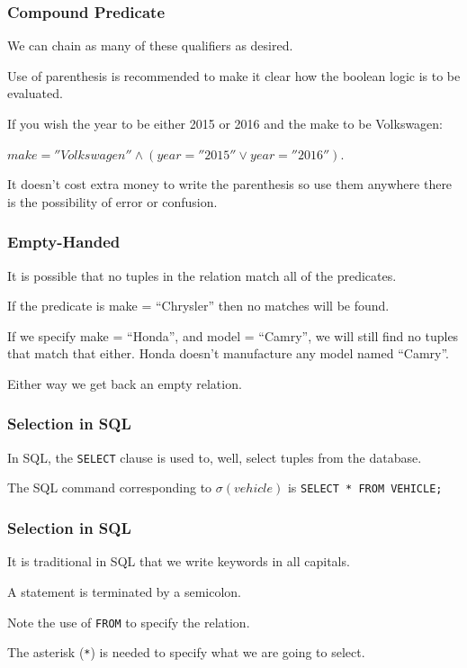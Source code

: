 \begin{frame}
\frametitle{Compound Predicate}

We can chain as many of these qualifiers as desired. 

Use of parenthesis is recommended to make it clear how the boolean logic is to be evaluated. 

If you wish the year to be either 2015 or 2016 and the make to be Volkswagen:

$make = ''Volkswagen'' \wedge ( year = ''2015'' \vee year = ''2016'' )$.

It doesn't cost extra money to write the parenthesis so use them anywhere there is the possibility of error or confusion. 


\end{frame}



\begin{frame}
\frametitle{Empty-Handed}

It is possible that no tuples in the relation match all of the predicates. 

If the predicate is make = ``Chrysler'' then no matches will be found. 

If we specify make = ``Honda'', and model = ``Camry'', we will still find no tuples that match that either. Honda doesn't manufacture any model named ``Camry''.

Either way we get back an empty relation.


\end{frame}




\begin{frame}
\frametitle{Selection in SQL}

In SQL, the \texttt{SELECT} clause is used to, well, select tuples from the database. 

The SQL command corresponding to $\sigma( vehicle )$ is \texttt{SELECT * FROM VEHICLE;} 

\end{frame}




\begin{frame}
\frametitle{Selection in SQL}

It is traditional in SQL that we write keywords in all capitals.

A statement is terminated by a semicolon. 

Note the use of \texttt{FROM} to specify the relation. 

The asterisk (\texttt{*}) is needed to specify what we are going to select.
\end{frame}



